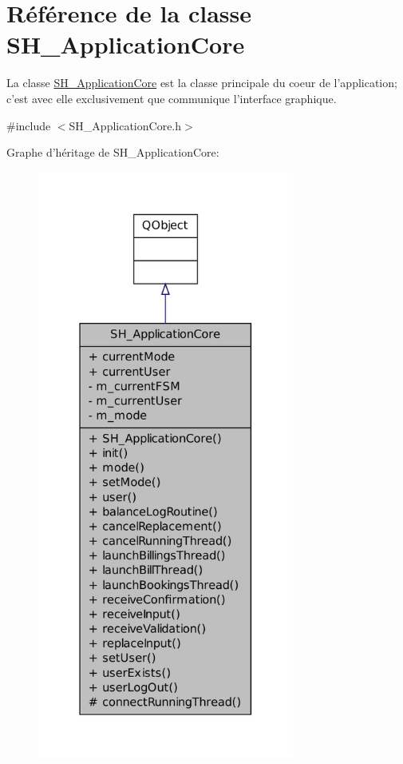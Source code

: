 \hypertarget{classSH__ApplicationCore}{\section{Référence de la classe S\-H\-\_\-\-Application\-Core}
\label{classSH__ApplicationCore}
}


La classe \hyperlink{classSH__ApplicationCore}{S\-H\-\_\-\-Application\-Core} est la classe principale du coeur de l'application; c'est avec elle exclusivement que communique l'interface graphique.  




{\ttfamily \#include $<$S\-H\-\_\-\-Application\-Core.\-h$>$}



Graphe d'héritage de S\-H\-\_\-\-Application\-Core\-:\nopagebreak
\begin{figure}[H]
\begin{center}
\leavevmode
\includegraphics[height=550pt]{classSH__ApplicationCore__inherit__graph}
\end{center}
\end{figure}


